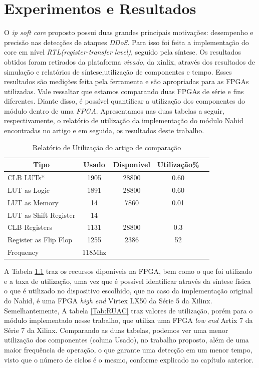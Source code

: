\chapter[Resultados]{Experimentos e Resultados}
\label{resultados}
O \textit{ip soft core} proposto possui duas grandes principais motivações: desempenho e precisão nas detecções de ataques \textit{DDoS}. Para isso foi feita a implementação do core em nível \textit{RTL(register-transfer level)}, seguido pela síntese. Os resultados obtidos foram retirados da plataforma \textit{vivado}, da xinlix, através dos resultados de simulação e relatórios de síntese,utilização de componentes e tempo. Esses resultados são medições feita pela ferramenta e são apropriadas para as FPGAs utilizadas. Vale ressaltar que estamos comparando duas FPGAs de série e fins diferentes. Diante disso, é possível quantificar a utilização dos componentes do módulo dentro de uma \textit{FPGA}. Apresentamos nas duas tabelas a seguir, respectivamente, o relatório de utilização da implementação do módulo Nahid encontradas no  artigo \cite{HOQUE201748} e em seguida, os resultados deste trabalho. 
\begin{table}[!htb]
	\centering
	\caption{Relatório de Utilização do artigo de comparação}
	\label{Tab:RUP}
	\begin{tabular}{lcccc}
		\hline
		\multicolumn{1}{c}{Tipo}&\multicolumn{1}{c}{Usado }&\multicolumn{1}{c}{Disponível}&\multicolumn{1}{c}{Utilização\%} \\ \midrule 
		
		CLB LUTs*&  1905  & 28800 & 0.60  \\   \midrule
		LUT as Logic & 1891  & 28800 &  0.60  \\  \midrule
		LUT as Memory &  14  & 7860 &  0.01  \\  \midrule
		LUT as Shift Register & 14  &  &   \\  \midrule
		CLB Registers  & 1131  & 28800 & 0.3  \\  \midrule
		Register as Flip Flop & 1255  & 2386  & 52    \\  \midrule
		Frequency &  118Mhz 
	\end{tabular}
\end{table}

A Tabela \ref{Tab:RUP} traz os recursos diponíveis na FPGA, bem como o que foi utilizado e a taxa de utilização, uma vez que é possível identificar através da síntese física o que é utilizado no dispositivo escolhido, que no caso da implementação original do Nahid, é uma FPGA \textit{high end} Virtex LX50 da Série 5 da Xilinx. Semelhantemente, A tabela \ref{Tab:RUAC} traz valores de utilização, porém para o módulo implementado nesse trabalho, que utiliza uma FPGA \textit{low end} Artix 7 da Série 7 da Xilinx. Comparando as duas tabelas, podemos ver uma menor utilização dos componentes (coluna Usado), no trabalho proposto, além de uma maior frequência de operação, o que garante uma detecção em um menor tempo, visto que o número de ciclos é o mesmo, conforme explicado no capítulo anterior.


